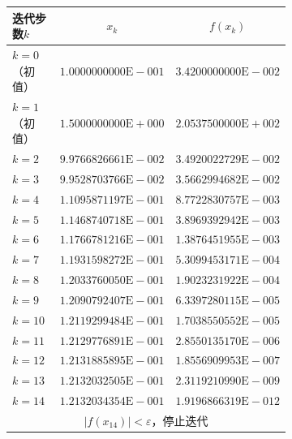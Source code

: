 \documentclass[11pt]{article}
\begin{document}
\begin{figure}
    \centering
    \begin{subfigure}[t]{.65\textwidth}
        \centering
        \begin{tabular}{|l|c|c|}
            \hline
            迭代步数$k$            & $x_k$                        & $f(x_k)$                     \\
            \hline $k = 0$（初值） & $1.0000000000\text{E}{-}001$ & $3.4200000000\text{E}{-}002$ \\
            \hline $k = 1$（初值） & $1.5000000000\text{E}{+}000$ & $2.0537500000\text{E}{+}002$ \\
            \hline $k = 2$         & $9.9766826661\text{E}{-}002$ & $3.4920022729\text{E}{-}002$ \\
            \hline $k = 3$         & $9.9528703766\text{E}{-}002$ & $3.5662994682\text{E}{-}002$ \\
            \hline $k = 4$         & $1.1095871197\text{E}{-}001$ & $8.7722830757\text{E}{-}003$ \\
            \hline $k = 5$         & $1.1468740718\text{E}{-}001$ & $3.8969392942\text{E}{-}003$ \\
            \hline $k = 6$         & $1.1766781216\text{E}{-}001$ & $1.3876451955\text{E}{-}003$ \\
            \hline $k = 7$         & $1.1931598272\text{E}{-}001$ & $5.3099453171\text{E}{-}004$ \\
            \hline $k = 8$         & $1.2033760050\text{E}{-}001$ & $1.9023231922\text{E}{-}004$ \\
            \hline $k = 9$         & $1.2090792407\text{E}{-}001$ & $6.3397280115\text{E}{-}005$ \\
            \hline $k = 10$        & $1.2119299484\text{E}{-}001$ & $1.7038550552\text{E}{-}005$ \\
            \hline $k = 11$        & $1.2129776891\text{E}{-}001$ & $2.8550135170\text{E}{-}006$ \\
            \hline $k = 12$        & $1.2131885895\text{E}{-}001$ & $1.8556909953\text{E}{-}007$ \\
            \hline $k = 13$        & $1.2132032505\text{E}{-}001$ & $2.3119210990\text{E}{-}009$ \\
            \hline $k = 14$        & $1.2132034354\text{E}{-}001$ & $1.9196866319\text{E}{-}012$ \\
            \hline \multicolumn{3}{|c|}{$|f(x_{14})| < \varepsilon$，停止迭代}                   \\

\end{tabular}
\end{subfigure}
\end{figure}
\end{document}
